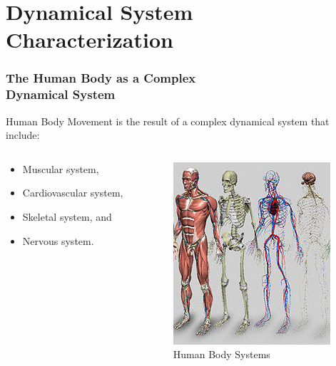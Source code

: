 \documentclass[
first,
ETH1,
navigation
]{ETHbeamerclass}
\begin{document}
\section{Dynamical System Characterization}


\begin{frame}
\frametitle{The Human Body as a Complex \\ Dynamical System}
Human Body Movement is the result of a complex dynamical system
 that include:  
\begin{columns}[onlytextwidth]
\begin{column}{0.5\textwidth}
\begin{itemize}
 \item Muscular system,
 \item Cardiovascular system,
 \item Skeletal system, and
 \item Nervous system.
\end{itemize}
\end{column} 
\begin{column}{0.5\textwidth}
\begin{figure}
\includegraphics[scale=0.4]{humanbodysystems}
\centering 
\caption{Human Body Systems}
\end{figure}
    \end{column}
\end{columns}

\end{frame}
\end{document}
